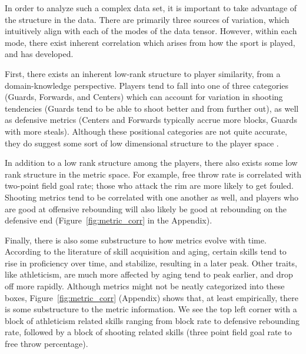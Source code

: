 \documentclass[aoas]{imsart}
\begin{document}
In order to analyze such a complex data set, it is important to take advantage of the structure in the data. There are primarily three sources of variation, which intuitively align with each of the modes of the data tensor. However, within each mode, there exist inherent correlation which arises from how the sport is played, and has developed.


First, there exists an inherent low-rank structure to player similarity, from a domain-knowledge perspective. Players tend to fall into one of three categories (Guards, Forwards, and Centers) which can account for variation in shooting tendencies (Guards tend to be able to shoot better and from further out), as well as defensive metrics (Centers and Forwards typically accrue more blocks, Guards with more steals). Although these positional categories are not quite accurate, they do suggest some sort of low dimensional structure to the player space \cite{chessa2023complex}.




In addition to a low rank structure among the players, there also exists some low rank structure in the metric space. For example, free throw rate is correlated with two-point field goal rate; those who attack the rim are more likely to get fouled.  Shooting metrics tend to be correlated with one another as well, and players who are good at offensive rebounding will also likely be good at rebounding on the defensive end (Figure~\ref{fig:metric_corr} in the Appendix).

Finally, there is also some substructure to how metrics evolve with time. According to the literature of skill acquisition and aging, certain skills tend to rise in proficiency over time, and stabilize, resulting in a later peak. Other traits, like athleticism, are much more affected by aging tend to peak earlier, and drop off more rapidly. Although metrics might not be neatly categorized into these boxes, Figure~\ref{fig:metric_corr} (Appendix) shows that, at least empirically, there is some substructure to the metric information. We see the top left corner with a block of athleticism related skills ranging from block rate to defensive rebounding rate, followed by a block of shooting related skills (three point field goal rate to free throw percentage). 
\end{document}
